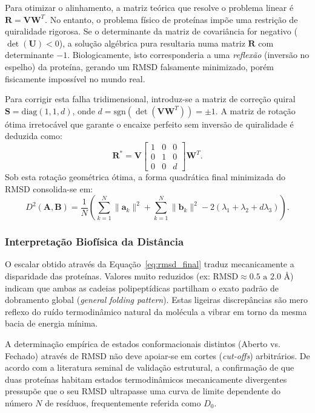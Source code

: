\documentclass[12pt, a4paper]{article}
\begin{document}
Para otimizar o alinhamento, a matriz teórica que resolve o problema linear é $\mathbf{R} = \mathbf{V} \mathbf{W}^T$. No entanto, o problema físico de proteínas impõe uma restrição de quiralidade rigorosa. Se o determinante da matriz de covariância for negativo ($\det(\mathbf{U}) < 0$), a solução algébrica pura resultaria numa matriz $\mathbf{R}$ com determinante $-1$. Biologicamente, isto corresponderia a uma \emph{reflexão} (inversão no espelho) da proteína, gerando um RMSD falsamente minimizado, porém fisicamente impossível no mundo real. 

Para corrigir esta falha tridimensional, introduz-se a matriz de correção quiral $\mathbf{S} = \mathrm{diag}(1, 1, d)$, onde $d = \mathrm{sgn}(\det(\mathbf{V}\mathbf{W}^T)) = \pm 1$. A matriz de rotação ótima irretocável que garante o encaixe perfeito sem inversão de quiralidade é deduzida como:
\begin{equation}
\mathbf{R}^* = \mathbf{V} \begin{bmatrix} 1 & 0 & 0 \\ 0 & 1 & 0 \\ 0 & 0 & d \end{bmatrix} \mathbf{W}^T.
\end{equation}
Sob esta rotação geométrica ótima, a forma quadrática final minimizada do RMSD consolida-se em:
\begin{equation}\label{eq:rmsd_final}
D^2(\mathbf{A}, \mathbf{B}) = \frac{1}{N} \left( \sum_{k=1}^N \|\mathbf{a}_k\|^2 + \sum_{k=1}^N \|\mathbf{b}_k\|^2 - 2(\lambda_1 + \lambda_2 + d \lambda_3) \right).
\end{equation}

\subsubsection{Interpretação Biofísica da Distância}

O escalar obtido através da Equação~\ref{eq:rmsd_final} traduz mecanicamente a disparidade das proteínas. Valores muito reduzidos (ex: $\text{RMSD} \approx 0.5 \text{ a } 2.0$ \AA) indicam que ambas as cadeias polipeptídicas partilham o exato padrão de dobramento global (\textit{general folding pattern}). Estas ligeiras discrepâncias são mero reflexo do ruído termodinâmico natural da molécula a vibrar em torno da mesma bacia de energia mínima.

A determinação empírica de estados conformacionais distintos (Aberto vs. Fechado) através de RMSD não deve apoiar-se em cortes (\textit{cut-offs}) arbitrários. De acordo com a literatura seminal de validação estrutural, a confirmação de que duas proteínas habitam estados termodinâmicos mecanicamente divergentes pressupõe que o seu RMSD ultrapasse uma curva de limite dependente do número $N$ de resíduos, frequentemente referida como $D_0$. 
\end{document}
